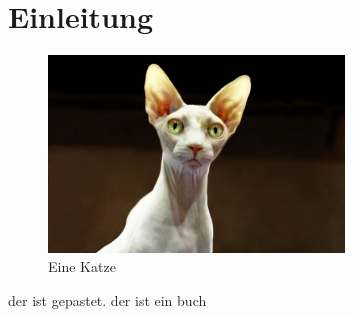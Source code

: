 
\chapter{Einleitung}
\begin{figure}[htb]
	\centering
		\includegraphics[width=0.7\textwidth]{images/cat.jpg}
	\caption{Eine Katze \cite{id}}
\end{figure}

der ist gepastet. \cite{id}
der ist ein buch \cite{book}


